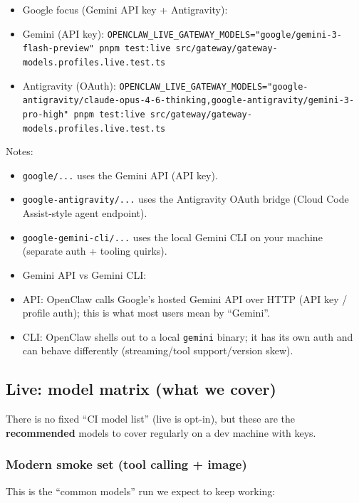 \begin{itemize}
  \item Google focus (Gemini API key + Antigravity):
  \item Gemini (API key): \texttt{OPENCLAW\_LIVE\_GATEWAY\_MODELS="google/gemini-3-flash-preview" pnpm test:live src/gateway/gateway-models.profiles.live.test.ts}
  \item Antigravity (OAuth): \texttt{OPENCLAW\_LIVE\_GATEWAY\_MODELS="google-antigravity/claude-opus-4-6-thinking,google-antigravity/gemini-3-pro-high" pnpm test:live src/gateway/gateway-models.profiles.live.test.ts}
\end{itemize}


Notes:

\begin{itemize}
  \item \texttt{google/...} uses the Gemini API (API key).
  \item \texttt{google-antigravity/...} uses the Antigravity OAuth bridge (Cloud Code Assist-style agent endpoint).
  \item \texttt{google-gemini-cli/...} uses the local Gemini CLI on your machine (separate auth + tooling quirks).
  \item Gemini API vs Gemini CLI:
  \item API: OpenClaw calls Google’s hosted Gemini API over HTTP (API key / profile auth); this is what most users mean by “Gemini”.
  \item CLI: OpenClaw shells out to a local \texttt{gemini} binary; it has its own auth and can behave differently (streaming/tool support/version skew).
\end{itemize}


\subsection{Live: model matrix (what we cover)}


There is no fixed “CI model list” (live is opt-in), but these are the \textbf{recommended} models to cover regularly on a dev machine with keys.

\subsubsection{Modern smoke set (tool calling + image)}


This is the “common models” run we expect to keep working:

